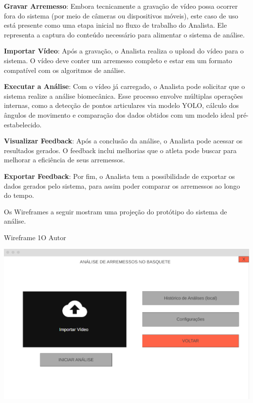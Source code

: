 \begin{myitemize}
    \item \textbf{Gravar Arremesso}: Embora tecnicamente a gravação de vídeo possa ocorrer fora do sistema (por meio de câmeras ou dispositivos móveis), este caso de uso está presente como uma etapa inicial no fluxo de trabalho do Analista. Ele representa a captura do conteúdo necessário para alimentar o sistema de análise.

    \item \textbf{Importar Vídeo}: Após a gravação, o Analista realiza o upload do vídeo para o sistema. O vídeo deve conter um arremesso completo e estar em um formato compatível com os algoritmos de análise.

    \item \textbf{Executar a Análise}: Com o vídeo já carregado, o Analista pode solicitar que o sistema realize a análise biomecânica. Esse processo envolve múltiplas operações internas, como a detecção de pontos articulares via modelo YOLO, cálculo dos ângulos de movimento e comparação dos dados obtidos com um modelo ideal pré-estabelecido.

    \item \textbf{Visualizar Feedback}: Após a conclusão da análise, o Analista pode acessar os resultados gerados. O feedback inclui melhorias que o atleta pode buscar para melhorar a eficiência de seus arremessos.
    
    \item \textbf{Exportar Feedback}: Por fim, o Analista tem a possibilidade de exportar os dados gerados pelo sistema, para assim poder comparar os arremessos ao longo do tempo.
\end{myitemize}


Os Wireframes a seguir mostram uma projeção do protótipo do sistema de análise.


\begin{figura}{Wireframe 1}{O Autor}
    \begin{flushleft}
        \label{fig:wireframe1}
        \includegraphics[width=0.69\linewidth]{resources/floats/ilustracoes/WIREFRAME1.png}
    \end{flushleft}
\end{figura}
\FloatBarrier

